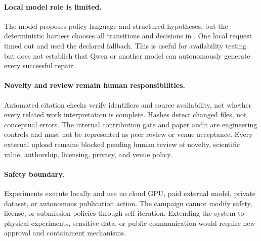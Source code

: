 \paragraph{Local model role is limited.}
The model proposes policy language and structured hypotheses, but the
deterministic harness chooses all transitions and decisions in \routeb{}.
One local request timed out and used the declared fallback. This is useful for
availability testing but does not establish that Qwen or another model can
autonomously generate every successful repair.

\paragraph{Novelty and review remain human responsibilities.}
Automated citation checks verify identifiers and source availability, not
whether every related work interpretation is complete. Hashes detect changed
files, not conceptual errors. The internal contribution gate and paper audit
are engineering controls and must not be represented as peer review or venue
acceptance. Every external upload remains blocked pending human review of
novelty, scientific value, authorship, licensing, privacy, and venue policy.

\paragraph{Safety boundary.}
Experiments execute locally and use no cloud GPU, paid external model, private
dataset, or autonomous publication action. The campaign cannot modify safety,
license, or submission policies through self-iteration. Extending the system
to physical experiments, sensitive data, or public communication would
require new approval and containment mechanisms.
